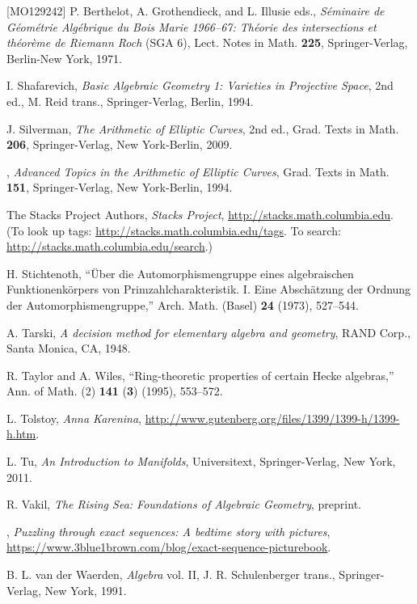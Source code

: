 \begin{thebibliography}{[MO129242]}
P. Berthelot, A. Grothendieck, and L. Illusie eds., \emph{Séminaire de
Géométrie Algébrique du Bois Marie 1966--67: Théorie des intersections et
théorème de Riemann Roch} (SGA 6), Lect. Notes in Math. \textbf{225},
Springer-Verlag, Berlin-New York, 1971.

I. Shafarevich, \emph{Basic Algebraic Geometry 1: Varieties in Projective
Space}, 2nd ed., M. Reid trans., Springer-Verlag, Berlin, 1994.

J. Silverman, \emph{The Arithmetic of Elliptic Curves}, 2nd ed., Grad. Texts
in Math. \textbf{206}, Springer-Verlag, New York-Berlin, 2009.

\sameauthor, \emph{Advanced Topics in the Arithmetic of Elliptic Curves},
Grad. Texts in Math. \textbf{151}, Springer-Verlag, New York-Berlin, 1994.

The Stacks Project Authors, \emph{Stacks Project},
\url{http://stacks.math.columbia.edu}. (To look up tags:
\url{http://stacks.math.columbia.edu/tags}. To search:
\url{http://stacks.math.columbia.edu/search}.)

H. Stichtenoth, ``Über die Automorphismengruppe eines algebraischen
Funktionenkörpers von Primzahlcharakteristik. I. Eine Abschätzung der Ordnung
der Automorphismengruppe,'' Arch. Math. (Basel) \textbf{24} (1973), 527--544.

A. Tarski, \emph{A decision method for elementary algebra and geometry}, RAND
Corp., Santa Monica, CA, 1948.

R. Taylor and A. Wiles, ``Ring-theoretic properties of certain Hecke
algebras,'' Ann. of Math. (2) \textbf{141} (\textbf{3}) (1995), 553--572.

L. Tolstoy, \emph{Anna Karenina},
\url{http://www.gutenberg.org/files/1399/1399-h/1399-h.htm}.

L. Tu, \emph{An Introduction to Manifolds}, Universitext, Springer-Verlag,
New York, 2011.

R. Vakil, \emph{The Rising Sea: Foundations of Algebraic Geometry}, preprint.

\sameauthor, \emph{Puzzling through exact sequences: A bedtime story with
pictures},
\url{https://www.3blue1brown.com/blog/exact-sequence-picturebook}.

B. L. van der Waerden, \emph{Algebra} vol. II, J. R. Schulenberger trans.,
Springer-Verlag, New York, 1991.


\end{thebibliography}

